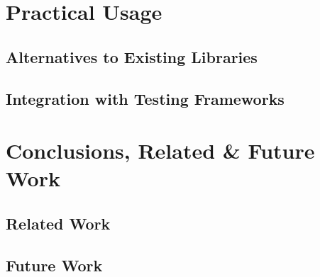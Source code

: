 \documentclass[openright, dottedtoc, headinclude, footinclude=true, a4paper, numbers=noenddot, fontsize=10pt]{scrreprt}
\newcommand{\Section}[2]{\section{#2}%
\label{chap:#1}%
}
\begin{document}
\Section{practice}{Practical Usage}
  \subsection{Alternatives to Existing Libraries}
  \label{sec:practice-alternatives}
  

  \subsection{Integration with Testing Frameworks}
  \label{sec:practice-integration}
  

\Section{conclusions}{Conclusions, Related \& Future Work}
  \subsection{Related Work}
  \label{sec:conclusions-related}
  

  \subsection{Future Work}
  \label{sec:conclusions-future}
  

\if@openright
  \cleardoublepage
\else
  \clearpage
\fi



\end{document}
